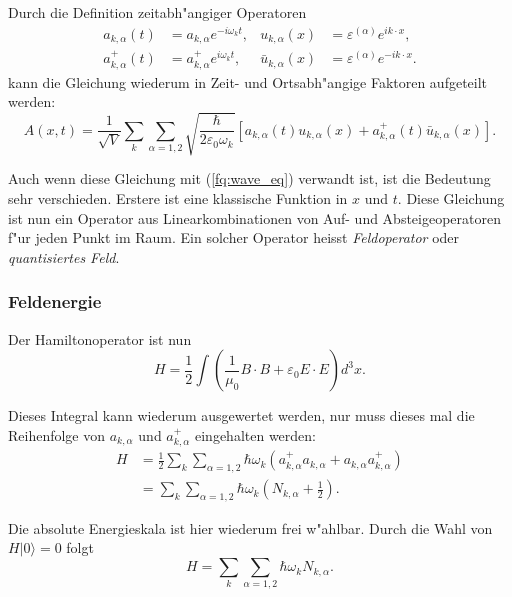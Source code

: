 Durch die Definition zeitabh"angiger Operatoren
\begin{align*}
a_{k,\alpha}(t) &= a_{k,\alpha} e^{-i \omega_k t}, &
u_{k,\alpha}(x) &= \varepsilon^{(\alpha)} e^{ik \cdot x}, \\
a^+_{k,\alpha}(t) &= a^+_{k,\alpha} e^{i \omega_k t}, &
\bar{u}_{k,\alpha}(x) &= \varepsilon^{(\alpha)} e^{-ik \cdot x}.
\end{align*}
kann die Gleichung wiederum in Zeit- und Ortsabh"angige Faktoren aufgeteilt werden:
\begin{equation*}
A(x,t) = \frac{1}{\sqrt{V}} \sum_k \sum_{\alpha=1,2} \sqrt{\frac{\hbar}{2 \varepsilon_0 \omega_k}}\left[a_{k,\alpha}(t) u_{k,\alpha}(x) + a^+_{k,\alpha}(t) \bar{u}_{k,\alpha}(x) \right].
\end{equation*}

Auch wenn diese Gleichung mit (\ref{fq:wave_eq}) verwandt ist, ist die Bedeutung sehr verschieden. Erstere ist eine klassische Funktion in $x$ und $t$. Diese Gleichung ist nun ein Operator aus Linearkombinationen von Auf- und Absteigeoperatoren f"ur jeden Punkt im Raum. Ein solcher Operator heisst {\em Feldoperator} oder {\em quantisiertes Feld}.

\subsubsection{Feldenergie}
Der Hamiltonoperator ist nun
\begin{equation*}
H = \frac{1}{2} \int \left(\frac{1}{\mu_0} B \cdot B + \varepsilon_0 E \cdot E \right) d^3 x.
\end{equation*}

Dieses Integral kann wiederum ausgewertet werden, nur muss dieses mal die Reihenfolge von $a_{k,\alpha}$ und $a^+_{k,\alpha}$ eingehalten werden:
\begin{equation*}
\begin{split}
H &= \frac{1}{2} \sum_k \sum_{\alpha=1,2} \hbar \omega_k \left(a^+_{k,\alpha} a_{k,\alpha} + a_{k,\alpha} a^+_{k,\alpha}\right) \\
&= \sum_k \sum_{\alpha=1,2} \hbar \omega_k \left(N_{k,\alpha} + \frac{1}{2} \right).
\end{split}
\end{equation*}

Die absolute Energieskala ist hier wiederum frei w"ahlbar. Durch die Wahl von $H|0\rangle = 0$ folgt
\begin{equation*}
H = \sum_k \sum_{\alpha=1,2} \hbar \omega_k N_{k,\alpha}.
\end{equation*}

